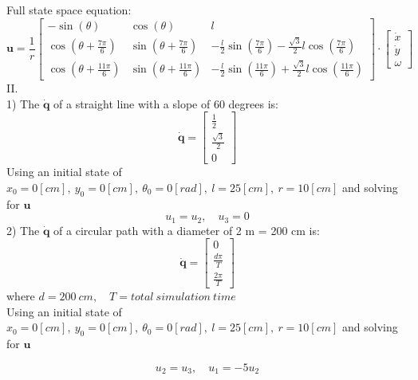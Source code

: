 \documentclass{article}
\begin{document}
\[\]
\newpage
Full state space equation:
\[
\bm{\mathbf{u}} = \frac{1}{r}\begin{bmatrix}
     -\sin(\theta) & \cos(\theta) & l \\  \cos(\theta + \frac{7\pi}{6}) & \sin(\theta + \frac{7\pi}{6}) & -\frac{l}{2}\sin(\frac{7\pi}{6}) - \frac{\sqrt{3}}{2}l\cos(\frac{7\pi}{6}) \\  \cos(\theta + \frac{11\pi}{6}) & \sin(\theta + \frac{11\pi}{6}) & -\frac{l}{2}\sin(\frac{11\pi}{6}) + \frac{\sqrt{3}}{2}l\cos(\frac{11\pi}{6})
\end{bmatrix} \cdot \begin{bmatrix}
    \dot{x} \\ \dot{y} \\ \omega
\end{bmatrix}
\]
II.
\[\]
1) The \(\bm{\mathbf{\dot{q}}}\) of a straight line with a slope of 60 degrees is:
\[
\renewcommand{\arraystretch}{1.3}
\bm{\mathbf{\dot{q}}} = \begin{bmatrix}
    \frac{1}{2} \\ \frac{\sqrt{3}}{2} \\ 0
\end{bmatrix}
\]
Using an initial state of \(x_0 = 0 [cm], \ y_0 = 0 [cm], \ \theta_0 = 0 [rad], \ l = 25 [cm], \ r = 10 [cm]\) and solving for \(\bm{\mathbf{u}}\)
\[
u_1 = u_2, \quad u_3 = 0
\]
2) The \(\bm{\mathbf{\dot{q}}}\) of a circular path with a diameter of 2 m = 200 cm is:
\[
\renewcommand{\arraystretch}{1.3}
\bm{\mathbf{\dot{q}}} = \begin{bmatrix}
    0 \\ \frac{d\pi}{T} \\ \frac{2\pi}{T}
\end{bmatrix}
\]
where \(d = 200 \ cm, \quad T = total \ simulation \ time\)
\[\]
Using an initial state of \(x_0 = 0 [cm], \ y_0 = 0 [cm], \ \theta_0 = 0 [rad], \ l = 25 [cm], \ r = 10 [cm]\) and solving for \(\bm{\mathbf{u}}\)

\[
u_2 = u_3, \quad u_1 = -5u_2
\]
\end{document}
